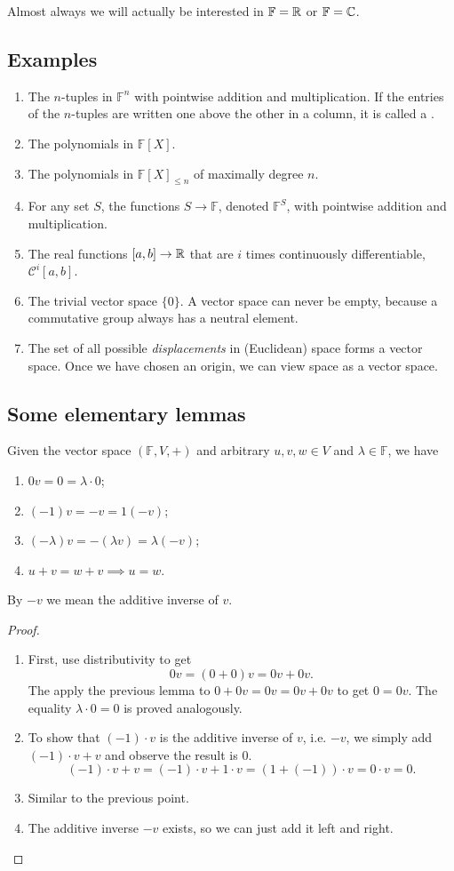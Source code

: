 Almost always we will actually be interested in $\mathbb{F} = \mathbb{R}$ or $\mathbb{F} = \mathbb{C}$.
\subsection{Examples}
\begin{enumerate}
\item The $n$-tuples in $\mathbb{F}^n$ with pointwise addition and multiplication. If the entries of the $n$-tuples are written one above the other in a column, it is called a .
\item The polynomials in $\mathbb{F}[X]$.
\item The polynomials in $\mathbb{F}[X]_{\leq n}$ of maximally degree $n$.
\item For any set $S$, the functions $S\to \mathbb{F}$, denoted $\mathbb{F}^S$, with pointwise addition and multiplication.
\item The real functions $[a,b]\to \mathbb{R}$ that are $i$ times continuously differentiable, $\mathcal{C}^i[a,b]$.
\item The trivial vector space $\{ 0\}$. A vector space can never be empty, because a commutative group always has a neutral element.
\item The set of all possible \textit{displacements} in (Euclidean) space forms a vector space. Once we have chosen an origin, we can view space as a vector space.
\end{enumerate}
\subsection{Some elementary lemmas}
\begin{lemma}
Given the vector space $(\mathbb{F}, V, +)$  and arbitrary $u,v,w\in V$ and $\lambda \in \mathbb{F}$, we have
\begin{enumerate}
\item $0v = 0 = \lambda \cdot 0$;
\item $(-1)v = -v = 1(-v)$;
\item $(-\lambda)v = -(\lambda v) = \lambda(-v)$;
\item $u+v = w+v \implies u = w$.
\end{enumerate}
By $-v$ we mean the additive inverse of $v$.
\end{lemma}
\begin{proof}
\begin{enumerate}
\item First, use distributivity to get
\[ 0v = (0+0)v = 0v + 0v. \]
The apply the previous lemma to $0+0v = 0v = 0v+0v$ to get $0=0v$. The equality $\lambda\cdot 0 = 0$ is proved analogously.
\item To show that $(-1)\cdot v$ is the additive inverse of $v$, i.e. $-v$, we simply add $(-1)\cdot v + v$ and observe the result is $0$.
\[ (-1)\cdot v + v = (-1)\cdot v + 1\cdot v = (1+(-1))\cdot v = 0\cdot v = 0. \]
\item Similar to the previous point.
\item The additive inverse $-v$ exists, so we can just add it left and right.
\end{enumerate}
\end{proof}
